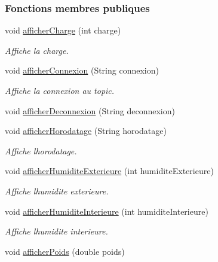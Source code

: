 \subsubsection*{Fonctions membres publiques}
\begin{DoxyCompactItemize}
\item 
void \hyperlink{classcom_1_1example_1_1bee__honeyt_1_1_i_h_m_mobile_a64c55ee927d9cb31265989d0296edc53}{afficher\+Charge} (int charge)
\begin{DoxyCompactList}\small\item\em Affiche la charge. \end{DoxyCompactList}\item 
void \hyperlink{classcom_1_1example_1_1bee__honeyt_1_1_i_h_m_mobile_a09149878e7ab1c24fa1b3aea037bd3fc}{afficher\+Connexion} (String connexion)
\begin{DoxyCompactList}\small\item\em Affiche la connexion au topic. \end{DoxyCompactList}\item 
void \hyperlink{classcom_1_1example_1_1bee__honeyt_1_1_i_h_m_mobile_a8eeb63d847d450223c641107e2f27f1a}{afficher\+Deconnexion} (String deconnexion)
\item 
void \hyperlink{classcom_1_1example_1_1bee__honeyt_1_1_i_h_m_mobile_ae1a488c4774eea0b794257f576ab932d}{afficher\+Horodatage} (String horodatage)
\begin{DoxyCompactList}\small\item\em Affiche l\textquotesingle{}horodatage. \end{DoxyCompactList}\item 
void \hyperlink{classcom_1_1example_1_1bee__honeyt_1_1_i_h_m_mobile_a8571df97f453ee83c35d653b06127691}{afficher\+Humidite\+Exterieure} (int humidite\+Exterieure)
\begin{DoxyCompactList}\small\item\em Affiche l\textquotesingle{}humidite exterieure. \end{DoxyCompactList}\item 
void \hyperlink{classcom_1_1example_1_1bee__honeyt_1_1_i_h_m_mobile_ae59dbfdcd0be7d98bb714398931028b5}{afficher\+Humidite\+Interieure} (int humidite\+Interieure)
\begin{DoxyCompactList}\small\item\em Affiche l\textquotesingle{}humidite interieure. \end{DoxyCompactList}\item 
void \hyperlink{classcom_1_1example_1_1bee__honeyt_1_1_i_h_m_mobile_a2f4fe6cded3a35b0152e43d546be5565}{afficher\+Poids} (double poids)

\end{DoxyCompactItemize}
